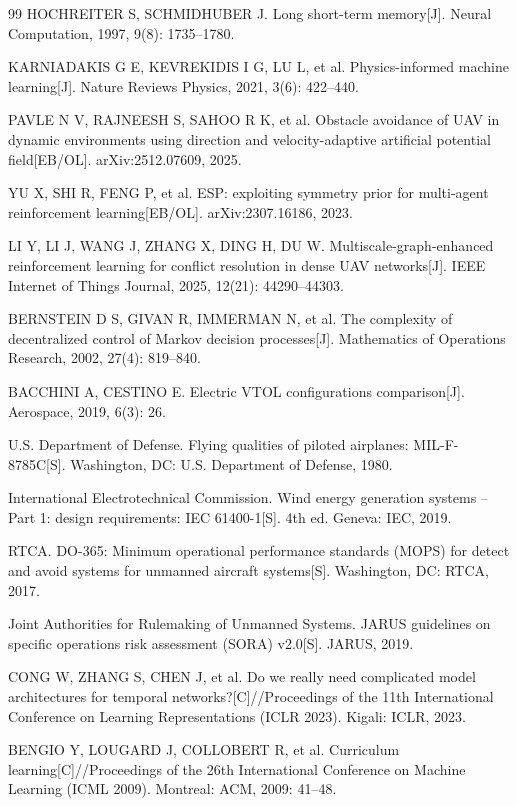 \documentclass[12pt,a4paper,UTF8]{ctexart}
\begin{document}
\begin{thebibliography}{99}
 HOCHREITER S, SCHMIDHUBER J. Long short-term memory[J]. Neural Computation, 1997, 9(8): 1735--1780.

 KARNIADAKIS G E, KEVREKIDIS I G, LU L, et al. Physics-informed machine learning[J]. Nature Reviews Physics, 2021, 3(6): 422--440.

 PAVLE N V, RAJNEESH S, SAHOO R K, et al. Obstacle avoidance of UAV in dynamic environments using direction and velocity-adaptive artificial potential field[EB/OL]. arXiv:2512.07609, 2025.

 YU X, SHI R, FENG P, et al. ESP: exploiting symmetry prior for multi-agent reinforcement learning[EB/OL]. arXiv:2307.16186, 2023.

 LI Y, LI J, WANG J, ZHANG X, DING H, DU W. Multiscale-graph-enhanced reinforcement learning for conflict resolution in dense UAV networks[J]. IEEE Internet of Things Journal, 2025, 12(21): 44290--44303.

 BERNSTEIN D S, GIVAN R, IMMERMAN N, et al. The complexity of decentralized control of Markov decision processes[J]. Mathematics of Operations Research, 2002, 27(4): 819--840.

 BACCHINI A, CESTINO E. Electric VTOL configurations comparison[J]. Aerospace, 2019, 6(3): 26.

 U.S. Department of Defense. Flying qualities of piloted airplanes: MIL-F-8785C[S]. Washington, DC: U.S. Department of Defense, 1980.

 International Electrotechnical Commission. Wind energy generation systems -- Part 1: design requirements: IEC 61400-1[S]. 4th ed. Geneva: IEC, 2019.

 RTCA. DO-365: Minimum operational performance standards (MOPS) for detect and avoid systems for unmanned aircraft systems[S]. Washington, DC: RTCA, 2017.

 Joint Authorities for Rulemaking of Unmanned Systems. JARUS guidelines on specific operations risk assessment (SORA) v2.0[S]. JARUS, 2019.

 CONG W, ZHANG S, CHEN J, et al. Do we really need complicated model architectures for temporal networks?[C]//Proceedings of the 11th International Conference on Learning Representations (ICLR 2023). Kigali: ICLR, 2023.

 BENGIO Y, LOUGARD J, COLLOBERT R, et al. Curriculum learning[C]//Proceedings of the 26th International Conference on Machine Learning (ICML 2009). Montreal: ACM, 2009: 41--48.


\end{thebibliography}
\end{document}
